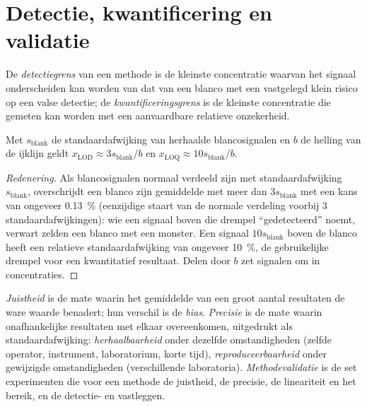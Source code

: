 \section{Detectie, kwantificering en validatie}

\begin{definition}[Grenzen]\label{def:b2:measurement-statistics:limits}
De \emph{detectiegrens} van een methode is de kleinste concentratie waarvan het
signaal onderscheiden kan worden van dat van een blanco met een vastgelegd klein risico op een valse detectie; de
\emph{kwantificeringsgrens} is de kleinste concentratie die
gemeten kan worden met een aanvaardbare relatieve onzekerheid.
\end{definition}

\begin{proposition}\label{prop:b2:measurement-statistics:lod}
Met $s_{\mathrm{blank}}$ de standaardafwijking van herhaalde blancosignalen en $b$ de helling van de
ijklijn geldt $x_{\mathrm{LOD}} \approx 3s_{\mathrm{blank}}/b$ en $x_{\mathrm{LOQ}} \approx
10s_{\mathrm{blank}}/b$.
\end{proposition}

\begin{proof}[Redenering]
Als blancosignalen normaal verdeeld zijn met standaardafwijking $s_{\mathrm{blank}}$, overschrijdt een blanco zijn gemiddelde met
meer dan $3s_{\mathrm{blank}}$ met een kans van ongeveer 0.13~\% (eenzijdige staart van de normale verdeling voorbij
3 standaardafwijkingen): wie een signaal boven die drempel ``gedetecteerd'' noemt, verwart zelden een blanco met
een monster. Een signaal $10s_{\mathrm{blank}}$ boven de blanco heeft een relatieve standaardafwijking van ongeveer
10~\%, de gebruikelijke drempel voor een kwantitatief resultaat. Delen door $b$ zet signalen om in
concentraties.
\end{proof}

\begin{definition}[Validatie]\label{def:b2:measurement-statistics:validation}
\emph{Juistheid} is de mate waarin het gemiddelde van een groot aantal resultaten de ware
waarde benadert; hun verschil is de \emph{bias}. \emph{Precisie} is de mate waarin
onafhankelijke resultaten met elkaar overeenkomen, uitgedrukt als standaardafwijking:
\emph{herhaalbaarheid} onder dezelfde omstandigheden (zelfde operator, instrument,
laboratorium, korte tijd), \emph{reproduceerbaarheid} onder gewijzigde omstandigheden
(verschillende laboratoria). \emph{Methodevalidatie} is de set experimenten
die voor een methode de juistheid, de precisie, de lineariteit en het bereik, en de detectie- en
 vastleggen.
\end{definition}

